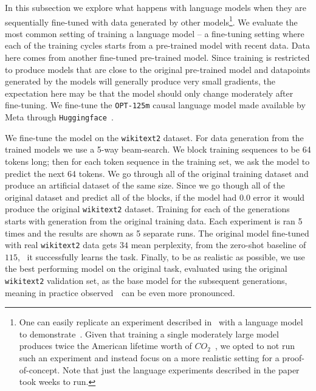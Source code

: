In this subsection we explore what happens with language models when they are sequentially fine-tuned with data generated by other models\footnote{One can easily replicate an experiment described in~ with a language model to demonstrate~\md. Given that training a single moderately large model produces twice the American lifetime worth of $CO_2$~\citep{strubell2019energy}, we opted to not run such an experiment and instead focus on a more realistic setting for a proof-of-concept. Note that just the language experiments described in the paper took weeks to run. }. We evaluate the most common setting of training a language model -- a fine-tuning setting where each of the training cycles starts from a pre-trained model with recent data. Data here comes from another fine-tuned pre-trained model. Since training is restricted to produce models that are close to the original pre-trained model and datapoints generated by the models will generally produce very small gradients, the expectation here may be that the model should only change moderately after fine-tuning. We fine-tune the \texttt{OPT-125m} causal language model made available by Meta through \texttt{Huggingface}~\citep{zhang2022opt}. 

We fine-tune the model on the \texttt{wikitext2} dataset. For data generation from the trained models we use a 5-way beam-search. We block training sequences to be 64 tokens long; then for each token sequence in the training set, we ask the model to predict the next 64 tokens. We go through all of the original training dataset and produce an artificial dataset of the same size. Since we go though all of the original dataset and predict all of the blocks, if the model had $0.0$ error it would produce the original \texttt{wikitext2} dataset. Training for each of the generations starts with generation from the original training data. Each experiment is ran 5 times and the results are shown as 5 separate runs. The original model fine-tuned with real \texttt{wikitext2} data gets $34$ mean perplexity, from the zero-shot baseline of $115$, \ie~it successfully learns the task. Finally, to be as realistic as possible, we use the best performing model on the original task, evaluated using the original \texttt{wikitext2} validation set, as the base model for the subsequent generations, meaning in practice observed~\Md~can be even more pronounced. 

